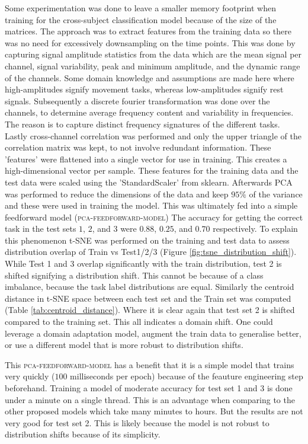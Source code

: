 \documentclass[conference]{IEEEtran}
\begin{document}
Some experimentation was done to leave a smaller memory footprint when training for the cross-subject classification model because of the size of the matrices. The approach was to extract features from the training data so there was no need for excessively downsampling on the time points. This was done by capturing signal amplitude statistics from the data which are the mean signal per channel, signal variability, peak and minimum amplitude, and the dynamic range of the channels. Some domain knowledge and assumptions are made here where high-amplitudes signify movement tasks, whereas low-amplitudes signify rest signals. Subsequently a discrete fourier transformation was done over the channels, to determine average frequency content and variability in frequencies. The reason is to capture distinct frequency signatures of the different tasks. Lastly cross-channel correlation was performed and only the upper triangle of the correlation matrix was kept, to not involve redundant information. These 'features' were flattened into a single vector for use in training. This creates a high-dimensional vector per sample. These features for the training data and the test data were scaled using the 'StandardScaler' from sklearn. Afterwards PCA was performed to reduce the dimensions of the data and keep $95\%$ of the variance and these were used in training the model. This was ultimately fed into a simple feedforward model (\textsc{pca-feedforward-model}) The accuracy for getting the correct task in the test sets $1$, $2$, and $3$ were $0.88$, $0.25$, and $0.70$ respectively. To explain this phenomenon t-SNE was performed on the training and test data to assess distribution overlap of Train vs Test1/2/3 (Figure \ref{fig:tsne_distribution_shift}). While Test 1 and 3 overlap significantly with the train distribution, test 2 is shifted signifying a distribution shift. This cannot be because of a class imbalance, because the task label distributions are equal. Similarly the centroid distance in t-SNE space between each test set and the Train set was computed (Table \ref{tab:centroid_distance}). Where it is clear again that test set 2 is shifted compared to the training set. This all indicates a domain shift. One could leverage a domain adaptation model, augment the train data to generalise better, or use a different model that is more robust to distribution shifts.

This \textsc{pca-feedforward-model} has a benefit that it is a simple model that trains very quickly ($100$ milliseconds per epoch) because of the feauture engineering step beforehand. Training a model of moderate accuracy for test set 1 and 3 is done under a minute on a single thread. This is an advantage when comparing to the other proposed models which take many minutes to hours. But the results are not very good for test set 2. This is likely because the model is not robust to distribution shifts because of its simplicity.
\end{document}
